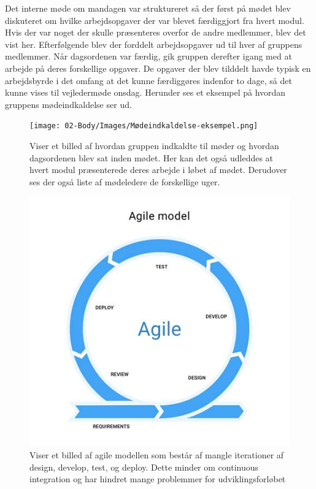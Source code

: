 Det interne møde om mandagen var struktureret så der først på mødet blev diskuteret om hvilke arbejdsopgaver der var blevet færdiggjort fra hvert modul. Hvis der var noget der skulle præsenteres overfor de andre medlemmer, blev det vist her. Efterfølgende blev der forddelt arbejdsopgaver ud til hver af gruppens medlemmer. Når dagsordenen var færdig, gik gruppen derefter igang med at arbejde på deres forskellige opgaver. De opgaver der blev tilddelt havde typisk en arbejdsbyrde i det omfang at det kunne færdiggøres indenfor to dage, så det kunne vises til vejledermøde onsdag. Herunder ses et eksempel på hvordan gruppens mødeindkaldelse ser ud.

\begin{figure}[H]
  \centering
  \texttt{[image: 02-Body/Images/Mødeindkaldelse-eksempel.png]}
  \caption{Viser et billed af hvordan gruppen indkaldte til møder og hvordan dagsordenen blev sat inden mødet. Her kan det også udleddes at hvert modul præsenterede deres arbejde i løbet af mødet. Derudover ses der også liste af mødeledere de forskellige uger.}
  \label{fig:Mødeindkaldelse}
\end{figure}

\begin{figure}[H]
  \centering
  \includegraphics[scale=.5]{02-Body/Images/Agile.png}
  \caption{Viser et billed af agile modellen som består af mangle iterationer
           af design, develop, test, og deploy. Dette minder om continuous integration
           og har hindret mange problemmer for udviklingsforløbet}
  \label{fig:Agile}
\end{figure}

